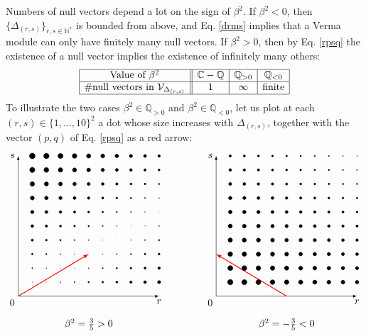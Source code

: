 \documentclass[12pt, a4paper]{article}
\theoremstyle{break}
\begin{document}
 Numbers of null vectors depend a lot on the sign of $\beta^2$. If $\beta^2<0$, then $\{\Delta_{(r, s)}\}_{r,s\in\mathbb{N}^*}$ is bounded from above, and Eq. \eqref{drms} implies that a Verma module can only have finitely many null vectors. If $\beta^2>0$, then by Eq. \eqref{rpsq} the existence of a null vector implies the existence of infinitely many others: 
\begin{align}
 \begin{array}{|c||c|c|c|}
  \hline 
  \text{Value of }\beta^2 & \mathbb{C}-\mathbb{Q} & \mathbb{Q}_{>0} & \mathbb{Q}_{<0}
  \\
  \hline 
  \#\text{null vectors in } \mathcal{V}_{\Delta_{(r, s)}} & 1 & \infty & \text{finite} 
  \\
  \hline 
 \end{array}
\end{align}
To illustrate the two cases $\beta^2\in \mathbb{Q}_{>0}$ and $\beta^2\in \mathbb{Q}_{<0}$, let us plot at each $(r,s)\in \{1,\dots, 10\}^2$ a dot whose size increases with 
$\Delta_{(r,s)}$, together with the vector $(p, q)$ of Eq. \eqref{rpsq} as a red arrow:
\begin{align}
 \begin{tikzpicture}[baseline=(base), scale = .5]
 \coordinate (base) at (0, 4);
  \draw[latex-latex] (0, 10) node [left] {$s$} -- (0, 0) node[below left] {$0$} -- (10, 0) node [below] {$r$};
  \draw[thick, red, -latex] (0, 0) -- (5, 3);
  \foreach \r in {1,...,10}{
  \foreach \s in {1,...,10}{
  \pgfmathsetmacro{\myrad}{.2+.12*abs(3*\r-5*\s)}
  \filldraw (\r, \s) circle [radius = \myrad pt];
  }}
  \node at (5, -2) {$\beta^2 = \frac35>0$};
 \end{tikzpicture}
 \qquad \qquad
 \begin{tikzpicture}[baseline=(base), scale = .5]
 \coordinate (base) at (0, 4);
  \draw[latex-latex] (0, 10) node [left] {$s$} -- (0, 0) node[below left] {$0$} -- (10, 0) node [below] {$r$};
  \draw[thick, red, -latex] (5, 0) -- (0, 3);
  \foreach \r in {1,...,10}{
  \foreach \s in {1,...,10}{
  \pgfmathsetmacro{\myrad}{6-(3*\r+5*\s)/15}
  \filldraw (\r, \s) circle [radius = \myrad pt];
  }}
  \node at (5, -2) {$\beta^2 = -\frac35<0$};
 \end{tikzpicture}
\end{align}
\end{document}
